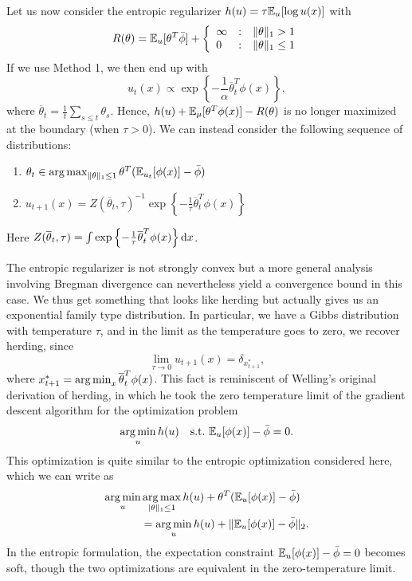 \documentclass{article}
\begin{document}
Let us now consider the entropic regularizer $h(u) = \tau\mathbb{E}_{u}[\log u(x)]$ with 
\[ R(\theta) = \mathbb{E}_{u}[\theta^T\bar{\phi}] + \left\{ \begin{array}{llc} \infty & : & \|\theta\|_1 > 1 \\ 0 & : & \|\theta\|_1 \leq 1 \end{array} \right.\]
If we use Method 1, we then end up with 
\[ u_{t}(x) \propto \exp\left\{-\frac{1}{\alpha}\overline{\theta}_{t}^T\phi(x)\right\}, \]
where $\overline{\theta}_{t} = \frac{1}{t} \sum_{s \le t} \theta_{s}$. Hence, $h(u) + \mathbb{E}_{\mu}[\theta^T\phi(x)] - R(\theta)$ is no longer maximized at the boundary (when $\tau > 0$). We can instead consider the following sequence of distributions:
\begin{enumerate}
\item $\theta_t \in \argmax_{\|\theta\|_1 \leq 1} \theta^T (\bE_{u_t}[\phi(x)]-\bar{\phi})$
\item $u_{t+1}(x) = Z(\overline{\theta}_{t}, \tau)^{-1} \exp\left\{-\frac{1}{\tau}\overline{\theta}_{t}^T\phi(x)\right\}$
\end{enumerate}
Here $Z(\overline{\theta}_{t}, \tau) = \int\exp\left\{-\frac{1}{\tau}\overline{\theta}_{t}^T\phi(x)\right\} \mathrm{d} x$. 

The entropic regularizer is not strongly convex but a more general analysis involving 
Bregman divergence can nevertheless yield a convergence bound in this case. We thus 
get something that looks like herding but actually gives us an exponential family 
type distribution. In particular, we have a Gibbs distribution with temperature $\tau$, and 
in the limit as the temperature goes to zero, we recover herding, since 
\[ \lim_{\tau \to 0} u_{t+1}(x) = \delta_{x^{*}_{t+1}}, \]
where $x^{*}_{t+1} = \argmin_{x} \overline{\theta}_{t}^T\phi(x)$. 
This fact is reminiscent of Welling's original derivation of herding, in which 
he took the zero temperature limit of the gradient descent algorithm for the optimization problem 
\[ \argmin_{u} h(u) \quad \text{s.t.}~\bE_{u}[\phi(x)] - \bar\phi = 0. \]
This optimization is quite similar to the entropic optimization considered here, which 
we can write as 
\begin{align*}
\argmin_{u}& \argmax_{|\theta\|_1 \leq 1} h(u) + \theta^{T}(\bE_{u}[\phi(x)] - \bar \phi)  \\
&= \argmin_{u} h(u) + \|\bE_{u}[\phi(x)] - \bar\phi\|_{2}. 
\end{align*}
In the entropic formulation, the expectation constraint $\mathbb{E}_{u}[\phi(x)] - \bar\phi = 0$ becomes
soft, though the two optimizations are equivalent in the zero-temperature limit. 
\end{document}
